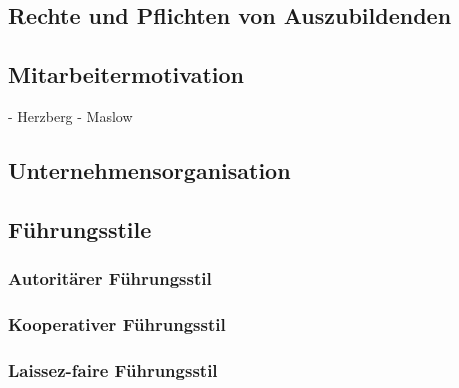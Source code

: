 \subsection{Rechte und Pflichten von Auszubildenden}

\subsection{Mitarbeitermotivation}
- Herzberg
- Maslow

\subsection{Unternehmensorganisation}

\subsection{Führungsstile}
\subsubsection{Autoritärer Führungsstil}
\subsubsection{Kooperativer Führungsstil}
\subsubsection{Laissez-faire Führungsstil}